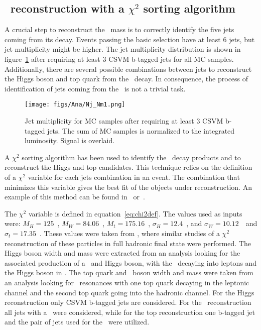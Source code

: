 \subsection{\Tp~reconstruction with a $\chi^{2}$ sorting algorithm}
\label{sec:chi2}

A crucial step to reconstruct the \Tp~mass is to correctly identify the five jets coming from its decay. Events passing the basic selection have at least 6 jets, but jet multiplicity might be higher. The jet multiplicity distribution is shown in figure~\ref{fig:Nj} after requiring at least 3 CSVM b-tagged jets for all MC samples. Additionally, there are several possible combinations between jets to reconstruct the Higgs boson and top quark from the \Tp~decay. In consequence, the process of identification of jets coming from the \Tp~is not a trivial task. 

\begin{figure}[!Hhtbp]
  \begin{center}
    \texttt{[image: figs/Ana/Nj\_Nm1.png]}
    \caption{Jet multiplicity for MC samples after requiring at least 3 CSVM b-tagged jets. The sum of MC samples is normalized to the integrated luminosity. Signal is overlaid.}
    \label{fig:Nj}
  \end{center}
\end{figure}

A $\chi^{2}$ sorting algorithm has been used to identify the \Tp~decay products and to reconstruct the Higgs and top candidates. This technique relies on the definition of a $\chi^{2}$ variable for each jets combination in an event. The combination that minimizes this variable gives the best fit of the objects under reconstruction. An example of this method can be found in~\cite{Chatrchyan:2014gma} or~\cite{Brochet:1956723}. 

The $\chi^{2}$ variable is defined in equation~\ref{eq:chi2def}. The values used as inputs were: $M_{H}=125$~\GeVcc, $M_{W}=84.06$~\GeVcc, $M_{t}=175.16$~\GeVcc, $\sigma_{H}=12.4$~\GeVcc, and $\sigma_{W}=10.12$~\GeVcc~and $\sigma_{t}=17.35$~\GeVcc. These values were taken from \cite{Brochet:1956723,Chatrchyan:2013zna}, where similar studies of a $\chi^{2}$ reconstruction of these particles in full hadronic final state were performed. The Higgs boson width and mass were extracted from an analysis looking for the associated production of a \Z~and Higgs boson, with the \Z~decaying into leptons and the Higgs boson in \bbbar. The top quark and \W~boson width and mass were taken from an analysis looking for \ttbar~resonances with one top quark decaying in the leptonic channel and the second top quark going into the hadronic channel. For the Higgs reconstruction only CSVM b-tagged jets are considered. For the \W~reconstruction all jets with a ~were considered, while for the top reconstruction one b-tagged jet and the pair of jets used for the \W~were utilized. %

